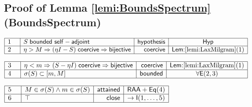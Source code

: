 \documentclass[11pt,reqno]{amsart}
\begin{document}
	\subsection*{Proof of Lemma \protect\ref{lemi:BoundsSpectrum} (\textsf{BoundsSpectrum})}
	\noindent$\begin{array}{|m{0.5cm}|l|r|c|}
	\hline
	1 & S\;\mathsf{bounded\ self-adjoint} & \mathsf{hypothesis} & \mathsf{Hyp} \\ \hline
	2 & \eta>M\Rightarrow(\eta I-S)\;\mathsf{coercive}\Rightarrow\mathsf{bijective} & \mathsf{coercive} & \textsf{Lem:}\ref{lemi:LaxMilgram}(1) \\ \hline
	\end{array}$
	\par\nointerlineskip\noindent$\begin{array}{|m{0.5cm}|l|r|c|}
	\hline
	3 & \eta<m\Rightarrow(S-\eta I)\;\mathsf{coercive}\Rightarrow\mathsf{bijective} & \mathsf{coercive} & \textsf{Lem:}\ref{lemi:LaxMilgram}(1) \\ \hline
	4 & \sigma(S)\subset[m,M] & \mathsf{bounded} & \forall\mathsf{E}(2,3) \\ \hline
	\end{array}$
	\par\nointerlineskip\noindent$\begin{array}{|m{0.5cm}|l|r|c|}
	\hline
	5 & M\in\sigma(S)\wedge m\in\sigma(S) & \mathsf{attained} & \mathsf{RAA+Eq}(4) \\ \hline
	6 & \top & \mathsf{close} & \to\mathsf{I}(1,\dots,5) \\ \hline
	\end{array}$
	\medskip
	
\end{document}
